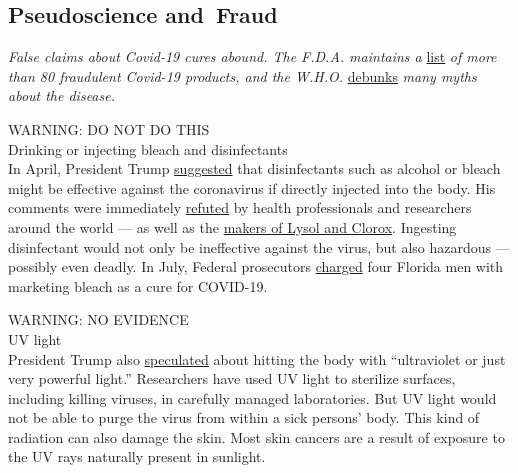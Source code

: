 \hypertarget{pseudoscience-and-fraud}{%
\subsection{Pseudoscience and~Fraud}\label{pseudoscience-and-fraud}}

\emph{False claims about Covid-19 cures abound. The F.D.A. maintains a}
\href{https://www.fda.gov/consumers/health-fraud-scams/fraudulent-coronavirus-disease-2019-covid-19-products}{list}
\emph{of more than 80 fraudulent Covid-19 products, and the W.H.O.}
\href{https://www.who.int/emergencies/diseases/novel-coronavirus-2019/advice-for-public/myth-busters}{debunks}
\emph{many myths about the disease.}

WARNING: DO NOT DO THIS\\
Drinking or injecting bleach and disinfectants\\
In April, President Trump
\href{https://www.nytimes3xbfgragh.onion/2020/04/24/health/sunlight-coronavirus-trump.html}{suggested}
that disinfectants such as alcohol or bleach might be effective against
the coronavirus if directly injected into the body. His comments were
immediately
\href{https://www.nytimes3xbfgragh.onion/2020/04/24/us/politics/trump-inject-disinfectant-bleach-coronavirus.html}{refuted}
by health professionals and researchers around the world --- as well as
the
\href{https://www.prweek.com/article/1681380/lysol-clorox-respond-trump-comment-injecting-disinfectant}{makers
of Lysol and Clorox}. Ingesting disinfectant would not only be
ineffective against the virus, but also hazardous --- possibly even
deadly. In July, Federal prosecutors
\href{https://www.wtsp.com/article/news/regional/florida/miracle-mineral-solution-genesis-ii-church-of-health-and-healing/67-b33b7f2e-2b0c-4853-8434-90732359d730}{charged}
four Florida men with marketing bleach as a cure for COVID-19.

WARNING: NO EVIDENCE\\
UV light\\
President Trump also
\href{https://www.nytimes3xbfgragh.onion/2020/04/24/health/sunlight-coronavirus-trump.html}{speculated}
about hitting the body with ``ultraviolet or just very powerful light.''
Researchers have used UV light to sterilize surfaces, including killing
viruses, in carefully managed laboratories. But UV light would not be
able to purge the virus from within a sick persons' body. This kind of
radiation can also damage the skin. Most skin cancers are a result of
exposure to the UV rays naturally present in sunlight.

